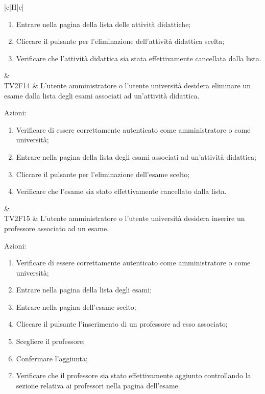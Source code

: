 \begin{longtable}{|c|H|c|}
\begin{enumerate}
			\item Entrare nella pagina della lista delle attività didattiche;
			\item Cliccare il pulsante per l'eliminazione dell'attività didattica scelta;
			\item Verificare che l'attività didattica sia stata effettivamente cancellata dalla lista.
		\end{enumerate} & \Tni \\
		\hline
		TV2F14 & L'utente amministratore o l'utente università desidera eliminare un esame dalla lista degli esami associati ad un'attività didattica. \newline \begin{flushleft}
			Azioni:\newline
		\end{flushleft}
		\begin{enumerate}
			\item Verificare di essere correttamente autenticato come amministratore o come università;
			\item Entrare nella pagina della lista degli esami associati ad un'attività didattica;
			\item Cliccare il pulsante per l'eliminazione dell'esame scelto;
			\item Verificare che l'esame sia stato effettivamente cancellato dalla lista.
		\end{enumerate} & \Tni \\
		\hline
		TV2F15 & L'utente amministratore o l'utente università desidera inserire un professore associato ad un esame. \newline \begin{flushleft}
			Azioni:\newline
		\end{flushleft}
		\begin{enumerate}
			\item Verificare di essere correttamente autenticato come amministratore o come università;
			\item Entrare nella pagina della lista degli esami;
			\item Entrare nella pagina dell'esame scelto;
			\item Cliccare il pulsante l'inserimento di un professore ad esso associato;
			\item Scegliere il professore;
			\item Confermare l'aggiunta;
			\item Verificare che il professore sia stato effettivamente aggiunto controllando la sezione relativa ai professori nella pagina dell'esame.

\end{enumerate}
\end{longtable}
